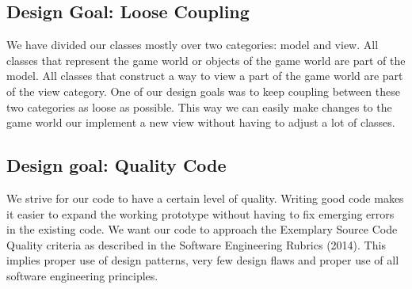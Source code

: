 \subsection{Design Goal: Loose Coupling}

We have divided our classes mostly over two categories: model and view. All classes that represent the game world or objects of the game world are part of the model. All classes that construct a way to view a part of the game world are part of the view category. One of our design goals was to keep coupling between these two categories as loose as possible. This way we can easily make changes to the game world our implement a new view without having to adjust a lot of classes.

\subsection{Design goal: Quality Code}

We strive for our code to have a certain level of quality. Writing good code makes it easier to expand the working prototype without having to fix emerging errors in the existing code. We want our code to approach the Exemplary Source Code Quality criteria as described in the Software Engineering Rubrics (2014).  This implies proper use of design patterns, very few design flaws and proper use of all software engineering principles. 